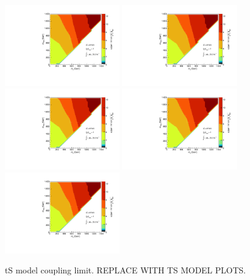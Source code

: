 \begin{figure}[!h]
\begin{center}
\includegraphics[width=0.45\textwidth]{figures/coupling_limits_TSD_1.pdf}
\includegraphics[width=0.45\textwidth]{figures/coupling_limits_TSD_1.pdf}
\includegraphics[width=0.45\textwidth]{figures/coupling_limits_TSD_1.pdf}
\includegraphics[width=0.45\textwidth]{figures/coupling_limits_TSD_1.pdf}
\includegraphics[width=0.45\textwidth]{figures/coupling_limits_TSD_1.pdf}
\caption{tS model coupling limit. REPLACE WITH TS MODEL PLOTS.}
\label{fig:MonoZ_TSD_couplinglimit}
\end{center}
\end{figure}

